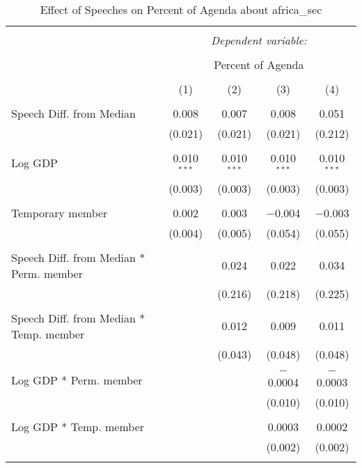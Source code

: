 
\begin{table}[!htbp] \centering 
  \caption{Effect of Speeches on Percent of Agenda about africa_sec} 
  \label{} 
\begin{tabular}{@{\extracolsep{5pt}}lcccc} 
\\[-1.8ex]\hline 
\hline \\[-1.8ex] 
 & \multicolumn{4}{c}{\textit{Dependent variable:}} \\ 
\cline{2-5} 
\\[-1.8ex] & \multicolumn{4}{c}{Percent of Agenda} \\ 
\\[-1.8ex] & (1) & (2) & (3) & (4)\\ 
\hline \\[-1.8ex] 
 Speech Diff. from Median & 0.008 & 0.007 & 0.008 & 0.051 \\ 
  & (0.021) & (0.021) & (0.021) & (0.212) \\ 
  & & & & \\ 
 Log GDP & 0.010$^{***}$ & 0.010$^{***}$ & 0.010$^{***}$ & 0.010$^{***}$ \\ 
  & (0.003) & (0.003) & (0.003) & (0.003) \\ 
  & & & & \\ 
 Temporary member & 0.002 & 0.003 & $-$0.004 & $-$0.003 \\ 
  & (0.004) & (0.005) & (0.054) & (0.055) \\ 
  & & & & \\ 
 Speech Diff. from Median * Perm. member &  & 0.024 & 0.022 & 0.034 \\ 
  &  & (0.216) & (0.218) & (0.225) \\ 
  & & & & \\ 
 Speech Diff. from Median * Temp. member &  & 0.012 & 0.009 & 0.011 \\ 
  &  & (0.043) & (0.048) & (0.048) \\ 
  & & & & \\ 
 Log GDP * Perm. member &  &  & $-$0.0004 & $-$0.0003 \\ 
  &  &  & (0.010) & (0.010) \\ 
  & & & & \\ 
 Log GDP * Temp. member &  &  & 0.0003 & 0.0002 \\ 
  &  &  & (0.002) & (0.002) \\ 
  & & & & \\ 

\end{tabular}
\end{table}
